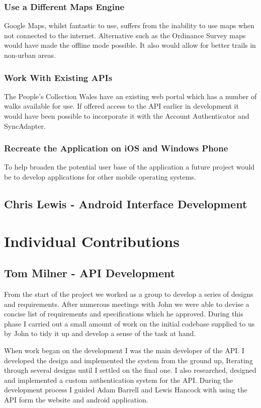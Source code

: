 \documentclass[11pt,a4paper]{report}
\begin{document}
\subsubsection{Use a Different Maps Engine}
Google Maps, whilst fantastic to use, suffers from the inability to use maps when not connected to the internet. Alternative such as the Ordinance Survey maps would have made the offline mode possible. It also would allow for better trails in non-urban areas.

\subsubsection{Work With Existing APIs}
The People's Collection Wales have an existing web portal which has a number of walks available for use. If offered access to the API earlier in development it would have been possible to incorporate it with the Account Authenticator and SyncAdapter.

\subsubsection{Recreate the Application on iOS and Windows Phone}
To help broaden the potential user base of the application a future project would be to develop applications for other mobile operating systems.

\subsection{Chris Lewis - Android Interface Development}

\section{Individual Contributions}
\label{sec:individual-contributions}

\subsection{Tom Milner - API Development}
From the start of the project we worked as a group to develop a series of designs and requirements. After numerous meetings with John we were able to devise a concise list of requirements and specifications which he approved. During this phase I carried out a small amount of work on the initial codebase supplied to us by John to tidy it up and develop a sense of the task at hand. 

When work began on the development I was the main developer of the API. I developed the design and implemented the system from the ground up, Iterating through several designs until I settled on the final one. I also researched, designed and implemented a custom authentication system for the API. During the development process I guided Adam Barrell and Lewis Hancock with using the API form the website and android application. 
\end{document}
